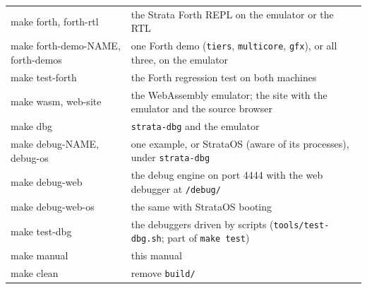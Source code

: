 \begin{center}
\begin{tabularx}{\linewidth}{@{}>{\ttfamily}l X@{}}
make forth, forth-rtl & the Strata Forth REPL on the emulator or the RTL\\
make forth-demo-NAME, forth-demos & one Forth demo (\texttt{tiers}, \texttt{multicore}, \texttt{gfx}), or all three, on the emulator\\
make test-forth & the Forth regression test on both machines\\
make wasm, web-site & the WebAssembly emulator; the site with the emulator and the source browser\\
make dbg & \texttt{strata-dbg} and the emulator\\
make debug-NAME, debug-os & one example, or StrataOS (aware of its processes), under \texttt{strata-dbg}\\
make debug-web & the debug engine on port 4444 with the web debugger at \texttt{/debug/}\\
make debug-web-os & the same with StrataOS booting\\
make test-dbg & the debuggers driven by scripts (\texttt{tools/test-dbg.sh}; part of \texttt{make test})\\
make manual & this manual\\
make clean & remove \texttt{build/}\\
\bottomrule
\end{tabularx}
\end{center}
